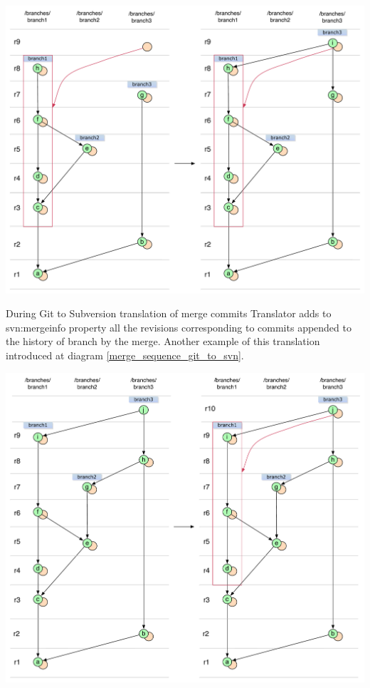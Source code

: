\begin{center}
\includegraphics[width=\textwidth]{img/diagrams/nested_merge_partly_mergeinfo_svn_to_git.pdf}%
\label{nested_merge_partly_mergeinfo_svn_to_git}%
\end{center}

During Git to Subversion translation of merge commits Translator adds to svn:mergeinfo property all the revisions corresponding to commits appended to the history of branch by the merge. Another example of this translation introduced at diagram \ref{merge_sequence_git_to_svn}.

\begin{center}
\includegraphics[width=\textwidth]{img/diagrams/merge_sequence_git_to_svn.pdf}%
\label{merge_sequence_git_to_svn}%
\end{center}

